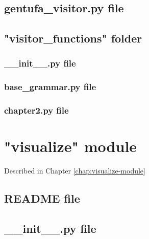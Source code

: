 \section{gentufa\_visitor.py file}



\section{"visitor\_functions" folder}

\subsection{\_\_init\_\_.py file}



\subsection{base\_grammar.py file}



\subsection{chapter2.py file}



\chapter{"visualize" module}
\label{appendix:visualize-annex}

Described in Chapter \ref{chap:visualize-module}

\section{README file}



\section{\_\_init\_\_.py file}

